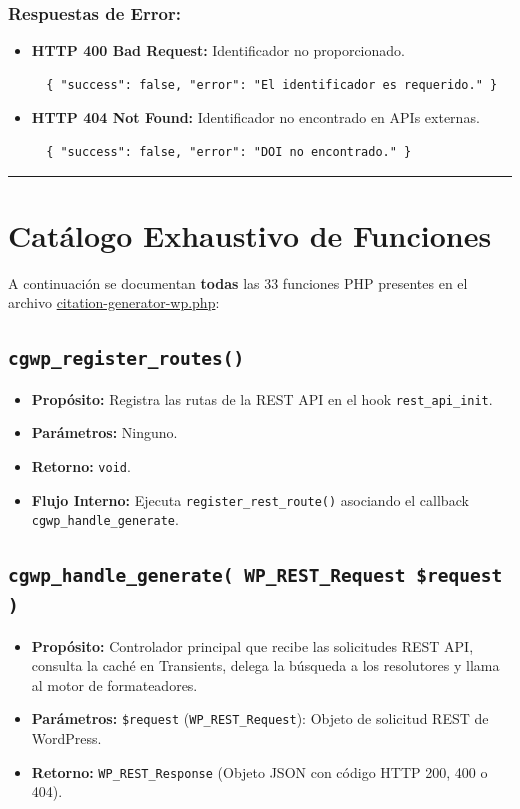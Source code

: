 \documentclass[11pt, a4paper]{article}
\begin{document}
\subsubsection{Respuestas de Error:}

\begin{itemize}
\item \textbf{HTTP 400 Bad Request:} Identificador no proporcionado.
\begin{lstlisting}
  { "success": false, "error": "El identificador es requerido." }
\end{lstlisting}
\item \textbf{HTTP 404 Not Found:} Identificador no encontrado en APIs externas.
\begin{lstlisting}
  { "success": false, "error": "DOI no encontrado." }
\end{lstlisting}
\end{itemize}

\bigskip\noindent\rule{\textwidth}{0.4pt}\bigskip


\section{Catálogo Exhaustivo de Funciones}

A continuación se documentan \textbf{todas} las 33 funciones PHP presentes en el archivo \href{file:///c:/Users/antho/Septimo%20Semestre/generador_citas/citation-generator-wp.php}{citation-generator-wp.php}:


\subsection{\texttt{cgwp\_register\_routes()}}
\begin{itemize}
\item \textbf{Propósito:} Registra las rutas de la REST API en el hook \texttt{rest\_api\_init}.
\item \textbf{Parámetros:} Ninguno.
\item \textbf{Retorno:} \texttt{void}.
\item \textbf{Flujo Interno:} Ejecuta \texttt{register\_rest\_route()} asociando el callback \texttt{cgwp\_handle\_generate}.
\end{itemize}
\subsection{\texttt{cgwp\_handle\_generate( WP\_REST\_Request \$request )}}
\begin{itemize}
\item \textbf{Propósito:} Controlador principal que recibe las solicitudes REST API, consulta la caché en Transients, delega la búsqueda a los resolutores y llama al motor de formateadores.
\item \textbf{Parámetros:} \texttt{\$request} (\texttt{WP\_REST\_Request}): Objeto de solicitud REST de WordPress.
\item \textbf{Retorno:} \texttt{WP\_REST\_Response} (Objeto JSON con código HTTP 200, 400 o 404).
\end{itemize}
\end{document}

